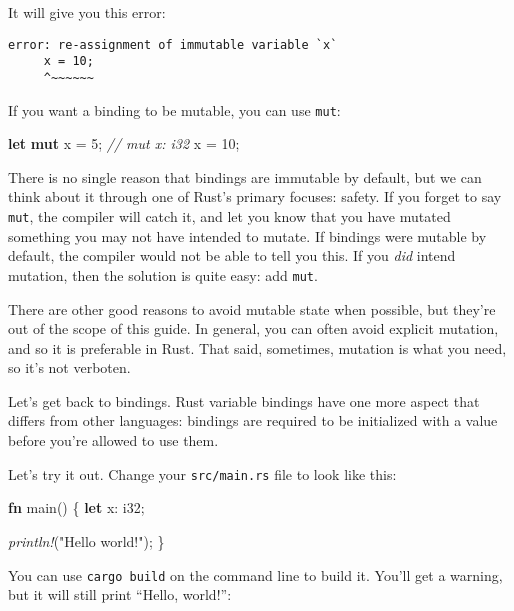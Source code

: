 \documentclass[a4paper,]{book}
\newenvironment{Shaded}{\begin{snugshade}}{\end{snugshade}}
\newcommand{\KeywordTok}[1]{\textcolor[rgb]{0.13,0.29,0.53}{\textbf{{#1}}}}
\newcommand{\DataTypeTok}[1]{\textcolor[rgb]{0.13,0.29,0.53}{{#1}}}
\newcommand{\DecValTok}[1]{\textcolor[rgb]{0.00,0.00,0.81}{{#1}}}
\newcommand{\StringTok}[1]{\textcolor[rgb]{0.31,0.60,0.02}{{#1}}}
\newcommand{\CommentTok}[1]{\textcolor[rgb]{0.56,0.35,0.01}{\textit{{#1}}}}
\newcommand{\PreprocessorTok}[1]{\textcolor[rgb]{0.56,0.35,0.01}{\textit{{#1}}}}
\newcommand{\NormalTok}[1]{{#1}}
\begin{document}
It will give you this error:

\begin{verbatim}
error: re-assignment of immutable variable `x`
     x = 10;
     ^~~~~~~
\end{verbatim}

If you want a binding to be mutable, you can use \texttt{mut}:

\begin{Shaded}
\begin{Highlighting}[]
\KeywordTok{let} \KeywordTok{mut} \NormalTok{x = }\DecValTok{5}\NormalTok{; }\CommentTok{// mut x: i32}
\NormalTok{x = }\DecValTok{10}\NormalTok{;}
\end{Highlighting}
\end{Shaded}

There is no single reason that bindings are immutable by default, but we
can think about it through one of Rust's primary focuses: safety. If you
forget to say \texttt{mut}, the compiler will catch it, and let you know
that you have mutated something you may not have intended to mutate. If
bindings were mutable by default, the compiler would not be able to tell
you this. If you \emph{did} intend mutation, then the solution is quite
easy: add \texttt{mut}.

There are other good reasons to avoid mutable state when possible, but
they're out of the scope of this guide. In general, you can often avoid
explicit mutation, and so it is preferable in Rust. That said,
sometimes, mutation is what you need, so it's not verboten.

Let's get back to bindings. Rust variable bindings have one more aspect
that differs from other languages: bindings are required to be
initialized with a value before you're allowed to use them.

Let's try it out. Change your \texttt{src/main.rs} file to look like
this:

\begin{Shaded}
\begin{Highlighting}[]
\KeywordTok{fn} \NormalTok{main() \{}
    \KeywordTok{let} \NormalTok{x: }\DataTypeTok{i32}\NormalTok{;}

    \PreprocessorTok{println!}\NormalTok{(}\StringTok{"Hello world!"}\NormalTok{);}
\NormalTok{\}}
\end{Highlighting}
\end{Shaded}

You can use \texttt{cargo\ build} on the command line to build it.
You'll get a warning, but it will still print ``Hello, world!'':
\end{document}
